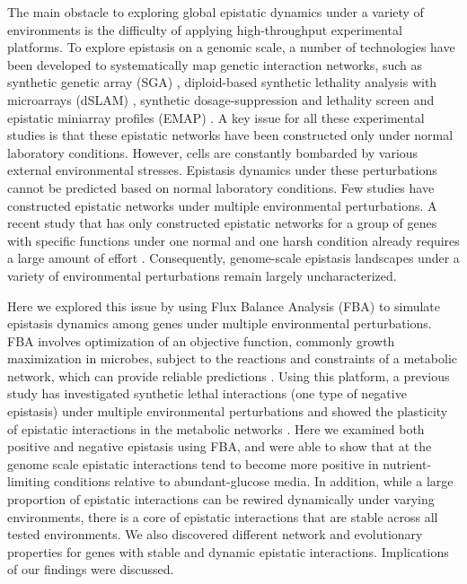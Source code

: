 The main obstacle to exploring global epistatic dynamics under a
variety of environments is the difficulty of applying high-throughput
experimental platforms. To explore epistasis on a genomic scale, a
number of technologies have been developed to systematically map
genetic interaction networks, such as synthetic genetic array (SGA)
\citep{Tong2004, Costanzo2010}, diploid-based synthetic lethality
analysis with microarrays (dSLAM) \citep{Pan2004, Pan2006}, synthetic
dosage-suppression and lethality screen \citep{Measday2002,
Measday2005, Sopko2006} and epistatic miniarray profiles (EMAP)
\citep{Collins2007, Fiedler2009, Kornmann2009}. A key issue for all
these experimental studies is that these epistatic networks have been
constructed only under normal laboratory
conditions. However, cells are constantly bombarded by various
external environmental stresses. Epistasis dynamics under these
perturbations cannot be predicted based on normal laboratory
conditions. Few studies have constructed epistatic networks under
multiple environmental perturbations. A recent study that has only
constructed epistatic networks for a group of genes with specific
functions under one normal and one harsh condition already requires a
large amount of effort \citep{Bandyopadhyay2011}. Consequently,
genome-scale epistasis landscapes under a variety of environmental
perturbations remain largely uncharacterized.

Here we explored this issue by using Flux Balance Analysis (FBA) to
simulate epistasis dynamics among genes under multiple environmental
perturbations. FBA involves optimization of an objective function,
commonly growth maximization in microbes, subject to the reactions and
constraints of a metabolic network, which can provide reliable
predictions \citep{Edwards2001, Shlomi2005, Becker2007, Feist2008,
Smallbone2009a, Orth2010}. Using this platform, a previous study has
investigated synthetic lethal interactions (one type of negative
epistasis) under multiple environmental perturbations and showed the
plasticity of epistatic interactions in the metabolic networks
\citep{Harrison2007}. Here we examined both positive and negative
epistasis using FBA,
and were able to show that at the genome scale epistatic interactions
tend to become more positive in nutrient-limiting conditions relative
to abundant-glucose media. In addition, while a large proportion of
epistatic interactions can be rewired dynamically under varying
environments, there is a core of epistatic interactions that are
stable across all tested environments. We also discovered different
network and evolutionary properties for genes with stable and dynamic
epistatic interactions. Implications of our findings were discussed.


